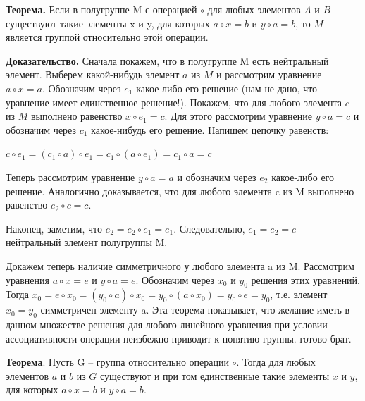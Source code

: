 \documentclass[a4paper]{article}
\begin{document}
    \begin{htheorem}
        \textbf{Теорема.} Если в полугруппе M с операцией $\circ$ для любых элементов $A$ и $B$
        существуют такие элементы x и y, для которых $a \circ x = b$ и $y \circ a  = b$, то $M$ является группой относительно этой операции.
    \end{htheorem}


    \begin{hproof}
        \textbf{Доказательство.} Сначала покажем, что в полугруппе M есть нейтральный
        элемент. Выберем какой-нибудь элемент $a$ из $M$ и рассмотрим уравнение $a \circ x = a$. Обозначим через $e_1$ какое-либо его решение (нам не дано, что уравнение
        имеет единственное решение!). Покажем, что для любого элемента $c$ из $M$
        выполнено равенство $x \circ e_1 = c$. Для этого рассмотрим уравнение $y \circ a  = c$ и обозначим через $c_1$ какое-нибудь его решение. Напишем цепочку равенств:

        $c \circ e_1 = (c_1 \circ a ) \circ e_1 = c_1 \circ ( a \circ e_1) = c_1 \circ a = c$

        Теперь рассмотрим уравнение $y \circ a = a$ и обозначим через $e_2$ какое-либо его
        решение. Аналогично доказывается, что для любого элемента c из M
        выполнено равенство $e_2 \circ c = c$.

        Наконец, заметим, что $e_2 = e_2 \circ e_1 = e_1$. Следовательно, $e_1 = e_2 = e$ –
        нейтральный элемент полугруппы M.

        Докажем теперь наличие симметричного у любого элемента a из M.
        Рассмотрим уравнения $a \circ x = e$ и $y \circ a = e$. Обозначим через $x_0$ и $y_0$ решения
        этих уравнений. Тогда $x_0 = e \circ x_0 = (y_0 \circ a) \circ x_0 = y_0 \circ (a \circ x_0) = y_0 \circ e = y_0$, т.е.
        элемент $x_0 = y_0$ симметричен элементу a.
        Эта теорема показывает, что желание иметь в данном множестве решения
        для любого линейного уравнения при условии ассоциативности операции
        неизбежно приводит к понятию группы. готово брат.
    \end{hproof}

    \begin{htheorem}
        \textbf{Теорема}. Пусть G – группа относительно операции $\circ$. Тогда для любых
        элементов $a$ и $b$ из $G$ существуют и при том единственные такие элементы $x$ и $y$,
        для которых $a
        \circ x = b$ и $y \circ a = b.$
    \end{htheorem}
\end{document}
